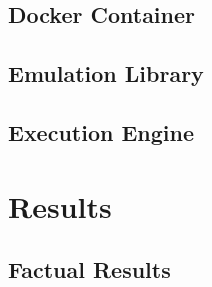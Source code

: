 \subsection{Docker Container}


\subsection{Emulation Library}


\subsection{Execution Engine}


\section{Results}
\subsection{Factual Results}

